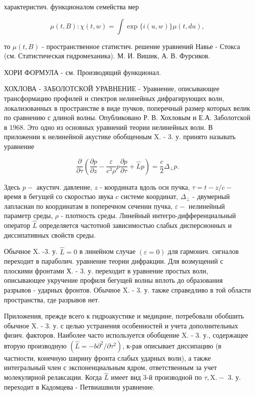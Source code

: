 \documentclass[10pt]{article}
\begin{document}
характеристич. функционалом семейства мер



\[

\mu(t, B): \chi(t, w)=\int \exp \{i(u, w)\} \mu(t, d u),

\]



то $\mu(t, B)$ - пространственное статистич. решение уравнений Навье - Стокса (см. Статистическая гидромеханика). М. И. Вишик, А. В. Фурсиков.



ХОРИ ФОРМУЛА - см. Производящий функционал.



ХОХЛОВА - ЗАБОЛОТСКОЙ УРАВНЕНИЕ - Уравнение, описывающее трансформацию профилей и спектров нелинейных дифрагирующих волн, локализованных в пространстве в виде пучков, поперечный размер которых велик по сравнению с длиной волны. Опубликовано Р. В. Хохловым и Е.А. Заболотской в 1968. Это одно из основных уравнений теории нелинейных волн. В приложении к нелинейной акустике обобщенным X. - 3. у. принято называть уравнение



\[

\frac{\partial}{\partial \tau}\left(\frac{\partial p}{\partial z}-\frac{\varepsilon}{c^{3} \rho} p \frac{\partial p}{\partial \tau}+\hat{L} p\right)=\frac{c}{2} \Delta_{\perp} p .

\]



Здесь $p-$ акустич. давление, $z$ - координата вдоль оси пучка, $\tau=t-z / c-$ время в бегущей со скоростью звука $c$ системе координат, $\Delta_{\perp}$ - двумерный лапласиан по координатам в поперечном сечении пучка, $\varepsilon-$ нелинейный параметр среды, $\rho$ - плотность среды. Линейный интегро-дифференциальный оператор $\hat{L}$ определяется частотной зависимостью слабых дисперсионных и диссипативных свойств среды.



Обычное X. -3. у. $\hat{L}=0$ в линейном случае $(\varepsilon=0)$ для гармонич. сигналов переходит в параболич. уравнение теории дифракции. Для возмущений с плоскими фронтами Х. - 3. у. переходит в уравнение простых волн, описывающее укручение профиля бегущей волны вплоть до образования разрывов - ударных фронтов. Обычное X. - 3. у. также справедливо в той области пространства, где разрывов нет.



Приложения, прежде всего к гидроакустике и медицине, потребовали обобшить обычное X. - 3. у. с целью устранения особенностей и учета дополнительных физич. факторов. Наиболее часто используется обобщение X. - 3. у., содержащее вторую производную $\left(\hat{L}=-b \partial^{2} / \partial \tau^{2}\right)$, к-рая описывает диссипацию (в частности, конечную ширину фронта слабых ударных волн), а также интегральный член с экспоненциальным ядром, ответственным за учет молекулярной релаксации. Когда $\hat{L}$ имеет вид 3-й производной по $\tau, \mathrm{X} .-$ 3. у. переходит в Кадомцева - Петвиашвили уравнение.
\end{document}
